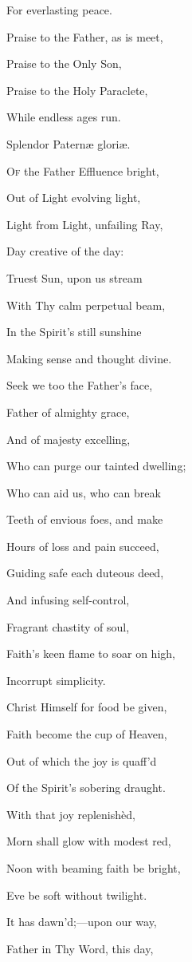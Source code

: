 For everlasting peace.

Praise to the Father, as is meet,

Praise to the Only Son,

Praise to the Holy Paraclete,

While endless ages run.


Splendor Paternæ gloriæ.

O\textsc{f} the Father Effluence bright,

Out of Light evolving light,

Light from Light, unfailing Ray,

Day creative of the day:

Truest Sun, upon us stream

With Thy calm perpetual beam,

In the Spirit's still sunshine

Making sense and thought divine.

Seek we too the Father's face,

Father of almighty grace,

And of majesty excelling,

Who can purge our tainted dwelling;

Who can aid us, who can break

Teeth of envious foes, and make

Hours of loss and pain succeed,

Guiding safe each duteous deed,

And infusing self-control,

Fragrant chastity of soul,

Faith's keen flame to soar on high,

Incorrupt simplicity.

Christ Himself for food be given,

Faith become the cup of Heaven,

Out of which the joy is quaff'd

Of the Spirit's sobering draught.

With that joy replenishèd,

Morn shall glow with modest red,

Noon with beaming faith be bright,

Eve be soft without twilight.

It has dawn'd;—upon our way,

Father in Thy Word, this day,

